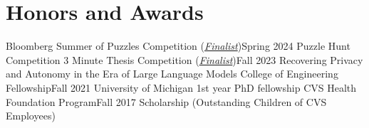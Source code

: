\section{Honors and Awards}
  \CVSubHeadingListStart
    \CVSubheading
      {Bloomberg Summer of Puzzles Competition (\underline{\textit{Finalist}})}{Spring 2024}
      {Puzzle Hunt Competition}{}
    \CVSubheading
      {3 Minute Thesis Competition (\underline{\textit{Finalist}})}{Fall 2023}
      {Recovering Privacy and Autonomy in the Era of Large Language Models}{}
    \CVSubheading
      {College of Engineering Fellowship}{Fall 2021}
      {University of Michigan 1st year PhD fellowship}{}
    \CVSubheading
      {CVS Health Foundation Program}{Fall 2017}
      {Scholarship (Outstanding Children of CVS Employees)}{}
  \CVSubHeadingListEnd